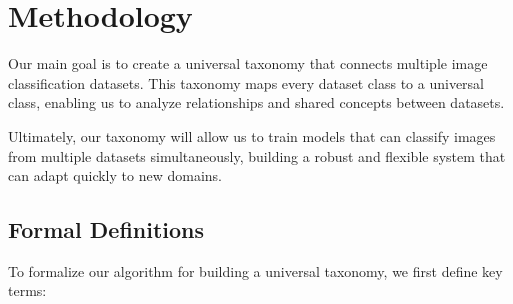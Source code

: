 \chapter{Methodology}

Our main goal is to create a universal taxonomy that connects multiple
image classification datasets.
This taxonomy maps every dataset class to a universal class,
enabling us to analyze relationships and shared concepts between datasets.

Ultimately, our taxonomy will allow us to train models that can classify images
from multiple datasets simultaneously, building a robust and flexible system
that can adapt quickly to new domains.

\section{Formal Definitions} \label{sec:taxonomy_definitions}

To formalize our algorithm for building a universal taxonomy,
we first define key terms:

